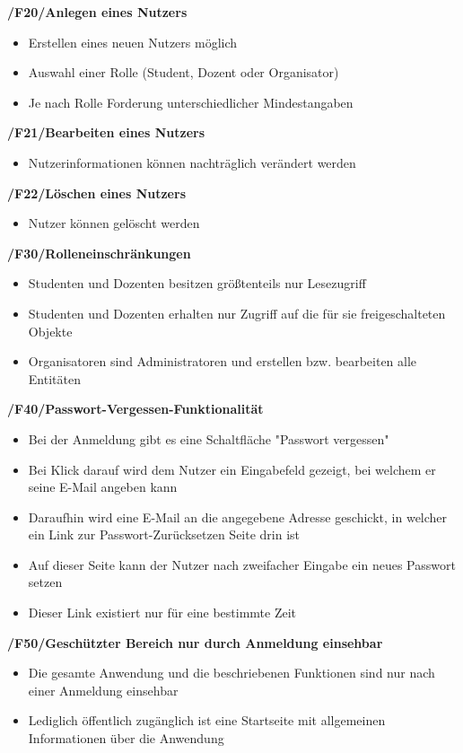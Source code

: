 \documentclass[12pt, a4paper]{scrartcl}
\newcommand{\ford}[2]{\textbf{/#1/\hspace{2em}#2}}
\begin{document}
\ford{F20}{Anlegen eines Nutzers}
\begin{itemize}
	\item Erstellen eines neuen Nutzers möglich
	\item Auswahl einer Rolle (Student, Dozent oder Organisator)
	\item Je nach Rolle Forderung unterschiedlicher Mindestangaben
\end{itemize}

\ford{F21}{Bearbeiten eines Nutzers}
\begin{itemize}
	\item Nutzerinformationen können nachträglich verändert werden
\end{itemize}

\ford{F22}{Löschen eines Nutzers}
\begin{itemize}
	\item Nutzer können gelöscht werden
\end{itemize}

\newpage
\ford{F30}{Rolleneinschränkungen}
\begin{itemize}
	\item Studenten und Dozenten besitzen größtenteils nur Lesezugriff
	\item Studenten und Dozenten erhalten nur Zugriff auf die für sie freigeschalteten Objekte
	\item Organisatoren sind Administratoren und erstellen bzw. bearbeiten alle Entitäten
\end{itemize}

\ford{F40}{Passwort-Vergessen-Funktionalität}
\begin{itemize}
	\item Bei der Anmeldung gibt es eine Schaltfläche "Passwort vergessen"
	\item Bei Klick darauf wird dem Nutzer ein Eingabefeld gezeigt, bei welchem er seine E-Mail angeben kann
	\item Daraufhin wird eine E-Mail an die angegebene Adresse geschickt, in welcher ein Link zur Passwort-Zurücksetzen Seite drin ist
	\item Auf dieser Seite kann der Nutzer nach zweifacher Eingabe ein neues Passwort setzen
	\item Dieser Link existiert nur für eine bestimmte Zeit
\end{itemize}

\ford{F50}{Geschützter Bereich nur durch Anmeldung einsehbar}
\begin{itemize}
	\item Die gesamte Anwendung und die beschriebenen Funktionen sind nur nach einer Anmeldung einsehbar
	\item Lediglich öffentlich zugänglich ist eine Startseite mit allgemeinen Informationen über die Anwendung 
\end{itemize}
\end{document}
